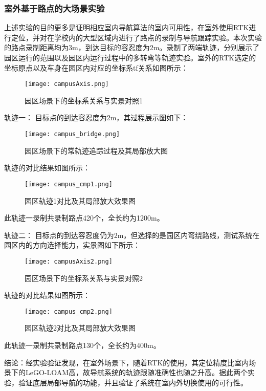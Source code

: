 \subsubsection{室外基于路点的大场景实验}
上述实验的目的更多是证明相应室内导航算法的室内可用性，在室外使用RTK进行定位，并对在学校内的大型区域内进行了路点的录制与导航跟踪实验。本次实验的路点录制距离均为3m，到达目标的容忍度为2m。录制了两端轨迹，分别展示了园区运行的范围以及园区内运行过程中的多转弯等轨迹实验。室外的RTK选定的坐标原点以及车身在园区内对应的坐标系tf关系如图所示：

\begin{figure}[ht]
    \centering
    \texttt{[image: campusAxis.png]}
    \caption{园区场景下的坐标系关系与实景对照1}
  \end{figure}



轨迹一： 目标点的到达容忍度为2m，其过程展示图如下：

\begin{figure}[ht]
    \centering
    \texttt{[image: campus\_bridge.png]}
    \caption{园区场景下的常轨迹追踪过程及其局部放大图}
  \end{figure}

轨迹的对比结果如图所示：

\begin{figure}[ht]
    \centering
    \texttt{[image: campus\_cmp1.png]}
    \caption{园区轨迹1对比及其局部放大效果图}
  \end{figure}

此轨迹一录制共录制路点420个，全长约为1200m。


轨迹二： 目标点的到达容忍度仍为2m，但选择的是园区内弯绕路线，测试系统在园区内的方向选择能力，实景图如下所示：

\begin{figure}[ht]
    \centering
    \texttt{[image: campusAxis2.png]}
    \caption{园区场景下的坐标系关系与实景对照2}
  \end{figure}

轨迹的对比结果如图所示：

\begin{figure}[ht]
    \centering
    \texttt{[image: campus\_cmp2.png]}
    \caption{园区轨迹2对比及其局部放大效果图}
  \end{figure}
此轨迹一录制共录制路点130个，全长约为400m。

结论：经实验验证发现，在室外场景下，随着RTK的使用，其定位精度比室内场景下的LeGO-LOAM高，故导航系统的轨迹跟随准确性也随之升高。据此两个实验，验证底层局部导航的功能，并且验证了系统在室内外切换使用的可行性。



















